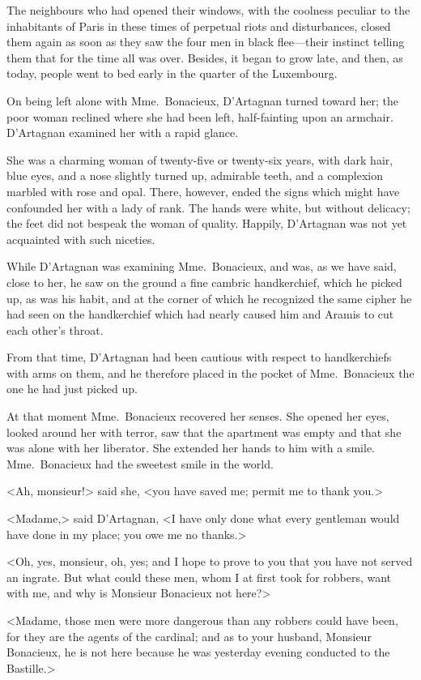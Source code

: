 The neighbours who had opened their windows, with the coolness peculiar to the inhabitants of Paris in these times of perpetual riots and disturbances, closed them again as soon as they saw the four men in black flee—their instinct telling them that for the time all was over. Besides, it began to grow late, and then, as today, people went to bed early in the quarter of the Luxembourg. 

On being left alone with Mme.~Bonacieux, D'Artagnan turned toward her; the poor woman reclined where she had been left, half-fainting upon an armchair. D'Artagnan examined her with a rapid glance. 

She was a charming woman of twenty-five or twenty-six years, with dark hair, blue eyes, and a nose slightly turned up, admirable teeth, and a complexion marbled with rose and opal. There, however, ended the signs which might have confounded her with a lady of rank. The hands were white, but without delicacy; the feet did not bespeak the woman of quality. Happily, D'Artagnan was not yet acquainted with such niceties. 

While D'Artagnan was examining Mme.~Bonacieux, and was, as we have said, close to her, he saw on the ground a fine cambric handkerchief, which he picked up, as was his habit, and at the corner of which he recognized the same cipher he had seen on the handkerchief which had nearly caused him and Aramis to cut each other's throat. 

From that time, D'Artagnan had been cautious with respect to handkerchiefs with arms on them, and he therefore placed in the pocket of Mme.~Bonacieux the one he had just picked up. 

At that moment Mme.~Bonacieux recovered her senses. She opened her eyes, looked around her with terror, saw that the apartment was empty and that she was alone with her liberator. She extended her hands to him with a smile. Mme.~Bonacieux had the sweetest smile in the world. 

<Ah, monsieur!> said she, <you have saved me; permit me to thank you.> 

<Madame,> said D'Artagnan, <I have only done what every gentleman would have done in my place; you owe me no thanks.> 

<Oh, yes, monsieur, oh, yes; and I hope to prove to you that you have not served an ingrate. But what could these men, whom I at first took for robbers, want with me, and why is Monsieur Bonacieux not here?> 

<Madame, those men were more dangerous than any robbers could have been, for they are the agents of the cardinal; and as to your husband, Monsieur Bonacieux, he is not here because he was yesterday evening conducted to the Bastille.> 

